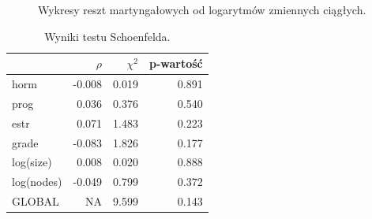 \documentclass[]{article}
\begin{document}
\begin{figure}[hbt!]
  \vspace{-10pt}
  \begin{center}
  \end{center}
  \vspace{-20pt}
  \label{fig:sc}
  \caption{Wykresy reszt martyngałowych od logarytmów zmiennych ciągłych.}

\end{figure}

\begin{table}
\vspace{-12pt}
\caption{ Wyniki testu Schoenfelda. }
\begin{tabular}{lrrr}
\toprule%
  & $\rho$ & $\chi^2$ & p-wartość\\ \toprule 

horm & -0.008 & 0.019 & 0.891\\

prog & 0.036 & 0.376 & 0.540\\

estr & 0.071 & 1.483 & 0.223\\

grade & -0.083 & 1.826 & 0.177\\

log(size) & 0.008 & 0.020 & 0.888\\

log(nodes) & -0.049 & 0.799 & 0.372\\

GLOBAL & NA & 9.599 & 0.143\\  \bottomrule
\end{tabular}
\vspace{-7.5pt}
\end{table}
\end{document}
